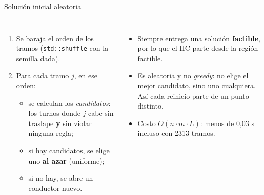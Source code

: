 \documentclass[aspectratio=169,10pt]{beamer}
\begin{document}
\begin{frame}{Solución inicial aleatoria}
\begin{columns}[T]
\begin{enumerate}
\item Se baraja el orden de los tramos (\texttt{std::shuffle} con la semilla dada).
\item Para cada tramo $j$, en ese orden:
  \begin{itemize}
  \item se calculan los \emph{candidatos}: los turnos donde $j$ cabe sin traslape \textbf{y} sin violar ninguna regla;
  \item si hay candidatos, se elige uno \textbf{al azar} (uniforme);
  \item si no hay, se abre un conductor nuevo.
  \end{itemize}
\end{enumerate}
\vspace{0.5em}
\begin{itemize}\small
\item Siempre entrega una solución \textbf{factible}, por lo que el HC parte desde la región factible.
\item Es aleatoria y no \emph{greedy}: no elige el mejor candidato, sino uno cualquiera. Así cada reinicio parte de un punto distinto.
\item Costo $O(n\cdot m\cdot L)$: menos de 0,03 s incluso con 2313 tramos.
\end{itemize}
\end{columns}
\end{frame}
\end{document}
